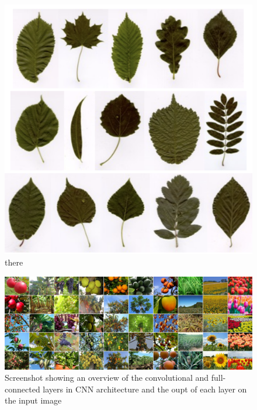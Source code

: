 \documentclass[conference]{IEEEtran}
\begin{document}
    \begin{figure}
   

        
        \centerline{\includegraphics[scale=0.25]{figures/Screenshot 2021-11-25 at 13.34.07.png}}
         \caption{there }

        \label{fig:gate4}
    \end{figure}

    \begin{figure}[htbp]
    
        \centerline{\includegraphics[width=1\textwidth]{figures/agrilplant-image.jpeg}}
        \caption{Screenshot showing an overview of the convolutional and full-connected layers in CNN architecture and the oupt of each layer on the input image \cite{pawara2017comparing}}

        \label{fig:agrilplant}
    \end{figure}
        
\end{document}
